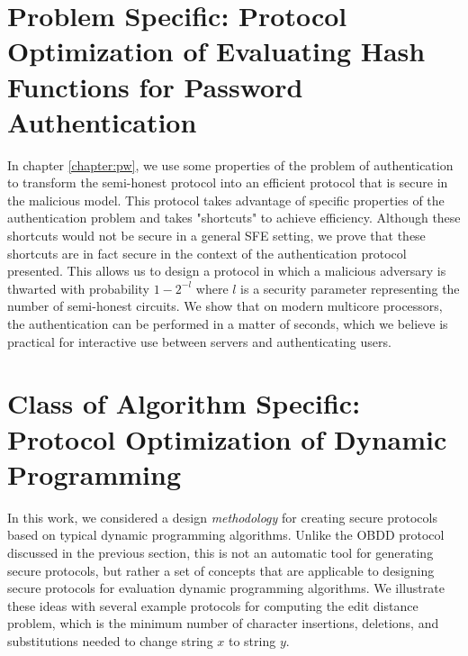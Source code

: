 \section{Problem Specific: Protocol Optimization of Evaluating Hash Functions for Password Authentication}
In chapter \ref{chapter:pw}, 
we use some properties of the problem of
authentication to transform the semi-honest protocol into an efficient protocol that is secure in the malicious model.  
This protocol takes
advantage of specific properties of the authentication problem and takes "shortcuts" to achieve efficiency.  Although
these shortcuts would not be secure in a general SFE setting, we prove that these shortcuts are in fact secure in the 
context of the authentication protocol presented.  This allows us to design a protocol in which a malicious adversary
is thwarted with probability $1-2^{-l}$ where $l$ is a security parameter representing the number of semi-honest circuits.
We show that on modern multicore processors, the authentication can be performed in a matter of seconds, which we believe is practical
for interactive use between servers and authenticating users.

\section{Class of Algorithm Specific: Protocol Optimization of Dynamic Programming}

In this work, we considered a design \emph{methodology} for creating
secure protocols based on typical dynamic programming algorithms.
Unlike the OBDD protocol discussed in the previous section, this is
not an automatic tool for generating secure protocols, but rather
a set of concepts that are applicable to designing secure protocols
for evaluation dynamic programming algorithms. We illustrate these
ideas with several example protocols for computing the edit distance
problem, which is the minimum number of character insertions, deletions,
and substitutions needed to change string $x$ to string $y$.

